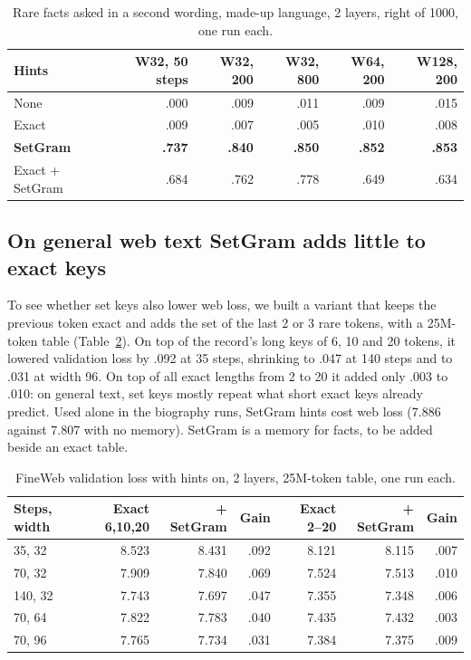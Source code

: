 \documentclass[11pt]{article}
\begin{document}
\begin{table}[h]\centering\small
\begin{tabular}{lrrrrr}\toprule
Hints & W32, 50 steps & W32, 200 & W32, 800 & W64, 200 & W128, 200\\\midrule
None & .000 & .009 & .011 & .009 & .015\\
Exact & .009 & .007 & .005 & .010 & .008\\
\textbf{SetGram} & \textbf{.737} & \textbf{.840} & \textbf{.850} & \textbf{.852} & \textbf{.853}\\
Exact + SetGram & .684 & .762 & .778 & .649 & .634\\\bottomrule
\end{tabular}
\caption{Rare facts asked in a second wording, made-up language, 2 layers, right of 1000, one run each.}\label{tab:factsbag}
\end{table}

\subsection{On general web text SetGram adds little to exact keys}
To see whether set keys also lower web loss, we built a variant that keeps the previous token exact and adds the set of the last 2 or 3 rare tokens, with a 25M-token table (Table~\ref{tab:webbag}). On top of the record's long keys of 6, 10 and 20 tokens, it lowered validation loss by .092 at 35 steps, shrinking to .047 at 140 steps and to .031 at width 96. On top of all exact lengths from 2 to 20 it added only .003 to .010: on general text, set keys mostly repeat what short exact keys already predict. Used alone in the biography runs, SetGram hints cost web loss (7.886 against 7.807 with no memory). SetGram is a memory for facts, to be added beside an exact table.

\begin{table}[h]\centering\small
\begin{tabular}{lrrrrrr}\toprule
Steps, width & Exact 6,10,20 & + SetGram & Gain & Exact 2--20 & + SetGram & Gain\\\midrule
35, 32 & 8.523 & 8.431 & .092 & 8.121 & 8.115 & .007\\
70, 32 & 7.909 & 7.840 & .069 & 7.524 & 7.513 & .010\\
140, 32 & 7.743 & 7.697 & .047 & 7.355 & 7.348 & .006\\
70, 64 & 7.822 & 7.783 & .040 & 7.435 & 7.432 & .003\\
70, 96 & 7.765 & 7.734 & .031 & 7.384 & 7.375 & .009\\\bottomrule
\end{tabular}
\caption{FineWeb validation loss with hints on, 2 layers, 25M-token table, one run each.}\label{tab:webbag}
\end{table}
\end{document}
